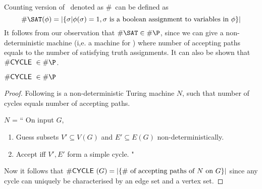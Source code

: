 

Counting version of \SAT~denoted as \#\SAT~can be defined as 
\[ \#\SAT(\phi) = |\{ \sigma | \phi(\sigma) = 1, \sigma \text{ is a boolean
assignment to variables in } \phi \}| \]
It follows from our observation that $\#\SAT \in \#\P$, since we can give a
non-deterministic machine (i,e. a machine for \SAT) where number of accepting
paths equals to the number of satisfying truth assignments. It can also be
shown that $\#\CYCLE \in \#\P$.

\begin{claim}
$\#\CYCLE \in \#\P$
\end{claim}
\begin{proof}
Following is a non-deterministic Turing machine $N$, such that number of
cycles equals number of accepting paths.

$N$ = `` On input $G$,
\begin{enumerate}
\item Guess subsets $V' \subseteq V(G)$ and $E' \subseteq E(G)$ 
non-deterministically.
\item Accept iff $V', E'$ form a simple cycle. "
\end{enumerate}

Now it follows that $\#{\sf CYCLE~}(G) = |\{ \# \text{ of accepting paths of } N
\text{ on } G \}|$ since any cycle can uniquely be characterised by an edge set
and a vertex set.
\end{proof}

